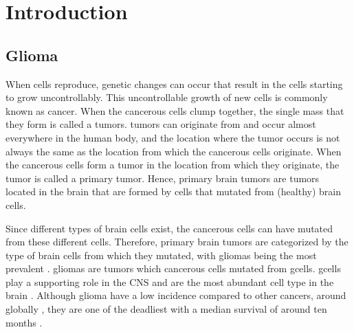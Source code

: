 
\chapter{Introduction}
\section{Glioma}

When cells reproduce, genetic changes can occur that result in the cells starting to grow uncontrollably.
This uncontrollable growth of new cells is commonly known as cancer.
When the cancerous cells clump together, the single mass that they form is called a \glspl{tumor}.
\Glspl{tumor} can originate from and occur almost everywhere in the human body, and the location where the \gls{tumor} occurs is not always the same as the location from which the cancerous cells originate.
When the cancerous cells form a \gls{tumor} in the location from which they originate, the \gls{tumor} is called a primary \gls{tumor}.
Hence, primary brain \glspl{tumor} are \glspl{tumor} located in the brain that are formed by cells that mutated from (healthy) brain cells.

Since different types of brain cells exist, the cancerous cells can have mutated from these different cells.
Therefore, primary brain \glspl{tumor} are categorized by the type of brain cells from which they mutated, with \glspl{glioma} being the most prevalent \autocite{leece2017indicence}.
\Glspl{glioma} are \glspl{tumor} which cancerous cells mutated from \glspl{gcell}.
\Glspl{gcell} play a supporting role in the \acrlong{CNS} and are the most abundant cell type in the brain \autocite{jakel2017glial}.
Although \gls{glioma} have a low incidence compared to other cancers, around  globally \autocite{leece2017indicence}, they are one of the deadliest with a median survival of around ten months \autocite{hess2004gliomaincidence}.

